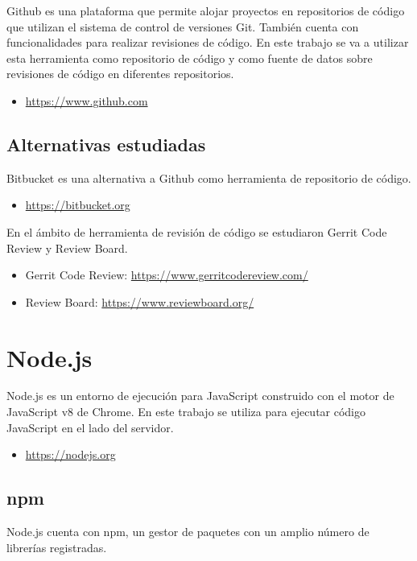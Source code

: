 Github es una plataforma que permite alojar proyectos en repositorios de código que utilizan el sistema de control de versiones Git. También cuenta con funcionalidades para realizar revisiones de código. En este trabajo se va a utilizar esta herramienta como repositorio de código y como fuente de datos sobre revisiones de código en diferentes repositorios.

\begin{itemize}
	\item \url{https://www.github.com}
\end{itemize}

\subsection{Alternativas estudiadas}

Bitbucket es una alternativa a Github como herramienta de repositorio de código.

\begin{itemize}
	\item \url{https://bitbucket.org}
\end{itemize}

En el ámbito de herramienta de revisión de código se estudiaron Gerrit Code Review y Review Board.

\begin{itemize}
	\item Gerrit Code Review: \url{https://www.gerritcodereview.com/}
	\item Review Board: \url{https://www.reviewboard.org/}
\end{itemize}

\section{Node.js}

Node.js es un entorno de ejecución para JavaScript construido con el motor de JavaScript v8 de Chrome. En este trabajo se utiliza para ejecutar código JavaScript en el lado del servidor.

\begin{itemize}
	\item \url{https://nodejs.org}
\end{itemize}

\subsection{npm}

Node.js cuenta con npm, un gestor de paquetes con un amplio número de librerías registradas.

